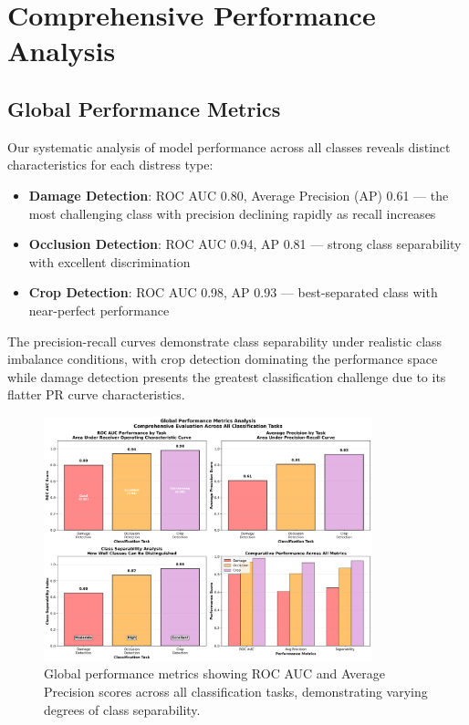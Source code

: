 \documentclass[12pt]{article}
\begin{document}
\section{Comprehensive Performance Analysis}

\subsection{Global Performance Metrics}

Our systematic analysis of model performance across all classes reveals distinct characteristics for each distress type:

\begin{itemize}[itemsep=1pt,parsep=0pt,topsep=3pt]
\item \textbf{Damage Detection}: ROC AUC 0.80, Average Precision (AP) 0.61 — the most challenging class with precision declining rapidly as recall increases
\item \textbf{Occlusion Detection}: ROC AUC 0.94, AP 0.81 — strong class separability with excellent discrimination
\item \textbf{Crop Detection}: ROC AUC 0.98, AP 0.93 — best-separated class with near-perfect performance
\end{itemize}

The precision-recall curves demonstrate class separability under realistic class imbalance conditions, with crop detection dominating the performance space while damage detection presents the greatest classification challenge due to its flatter PR curve characteristics.

\begin{figure}[!htb]
\centering
\includegraphics[width=0.85\textwidth]{images/performance_metrics_analysis.png}
\caption{Global performance metrics showing ROC AUC and Average Precision scores across all classification tasks, demonstrating varying degrees of class separability.}
\end{figure}
\end{document}

